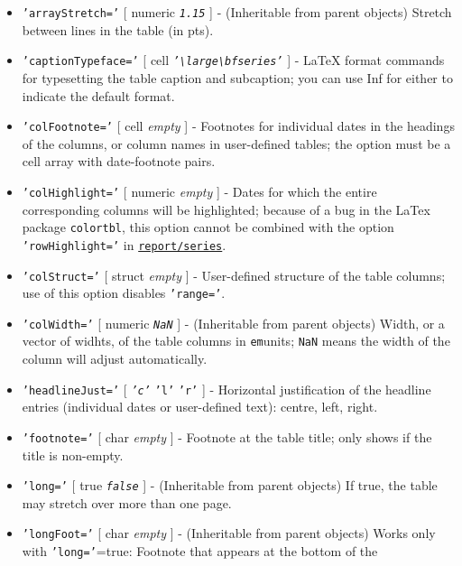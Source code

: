 \begin{itemize}
\item
  \texttt{'arrayStretch='} {[} numeric \textbar{} \emph{\texttt{1.15}}
  {]} - (Inheritable from parent objects) Stretch between lines in the
  table (in pts).
\item
  \texttt{'captionTypeface='} {[} cell \textbar{}
  \emph{\texttt{'\textbackslash{}large\textbackslash{}bfseries'}} {]} -
  LaTeX format commands for typesetting the table caption and
  subcaption; you can use Inf for either to indicate the default format.
\item
  \texttt{'colFootnote='} {[} cell \textbar{} \emph{empty} {]} -
  Footnotes for individual dates in the headings of the columns, or
  column names in user-defined tables; the option must be a cell array
  with date-footnote pairs.
\item
  \texttt{'colHighlight='} {[} numeric \textbar{} \emph{empty} {]} -
  Dates for which the entire corresponding columns will be highlighted;
  because of a bug in the LaTex package \texttt{colortbl}, this option
  cannot be combined with the option \texttt{'rowHighlight='} in
  \href{report/series}{\texttt{report/series}}.
\item
  \texttt{'colStruct='} {[} struct \textbar{} \emph{empty} {]} -
  User-defined structure of the table columns; use of this option
  disables \texttt{'range='}.
\item
  \texttt{'colWidth='} {[} numeric \textbar{} \emph{\texttt{NaN}} {]} -
  (Inheritable from parent objects) Width, or a vector of widhts, of the
  table columns in \texttt{em}units; \texttt{NaN} means the width of the
  column will adjust automatically.
\item
  \texttt{'headlineJust='} {[} \emph{\texttt{'c'}} \textbar{}
  \texttt{'l'} \textbar{} \texttt{'r'} {]} - Horizontal justification of
  the headline entries (individual dates or user-defined text): centre,
  left, right.
\item
  \texttt{'footnote='} {[} char \textbar{} \emph{empty} {]} - Footnote
  at the table title; only shows if the title is non-empty.
\item
  \texttt{'long='} {[} true \textbar{} \emph{\texttt{false}} {]} -
  (Inheritable from parent objects) If true, the table may stretch over
  more than one page.
\item
  \texttt{'longFoot='} {[} char \textbar{} \emph{empty} {]} -
  (Inheritable from parent objects) Works only with
  \texttt{'long='}=true: Footnote that appears at the bottom of the

\end{itemize}
